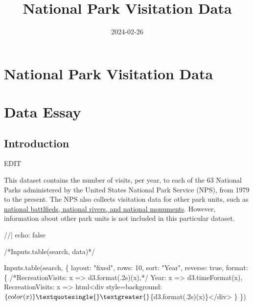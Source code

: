 \documentclass[
  letterpaper,
  DIV=11,
  numbers=noendperiod]{scrartcl}
\title{National Park Visitation Data}
\author{}
\date{2024-02-26}
\newenvironment{Shaded}{\begin{snugshade}}{\end{snugshade}}
\newcommand{\NormalTok}[1]{\textcolor[rgb]{0.00,0.23,0.31}{#1}}
\renewcommand*\contentsname{Table of contents}
\newcommand\contentsname{Table of contents}
\begin{document}
\maketitle

\renewcommand*\contentsname{Table of Contents}
{
\hypersetup{linkcolor=}
\setcounter{tocdepth}{5}
\tableofcontents
}
\section{National Park Visitation
Data}\label{national-park-visitation-data}

\section{Data Essay}

\subsection{Introduction}\label{introduction}

EDIT

This dataset contains the number of visits, per year, to each of the 63
National Parks administered by the United States National Park Service
(NPS), from 1979 to the present. The NPS also collects visitation data
for other park units, such as
\href{(https://www.nps.gov/aboutus/national-park-system.htm)}{national
battlfieds, national rivers, and national monuments}. However,
information about other park units is not included in this particular
dataset.

\begin{Shaded}
\begin{Highlighting}[]
\NormalTok{//| echo: false}

\NormalTok{/*Inputs.table(search, data)*/}

\NormalTok{Inputs.table(search, \{}
\NormalTok{  layout: "fixed",}
\NormalTok{  rows: 10,}
\NormalTok{  sort: "Year",}
\NormalTok{  reverse: true,}
\NormalTok{  format: \{}
\NormalTok{    /*RecreationVisits: x =\textgreater{} d3.format(\textquotesingle{}.2s\textquotesingle{})(x),*/}
\NormalTok{    Year: x =\textgreater{} d3.timeFormat(x),}
\NormalTok{    RecreationVisits: x =\textgreater{} html\textasciigrave{}\textless{}div style=\textquotesingle{}background:$\{color(x)\}\textquotesingle{}\textgreater{}$\{d3.format(\textquotesingle{}.2s\textquotesingle{})(x)\}\textless{}/div\textgreater{}\textasciigrave{}}
\NormalTok{  \}}
\NormalTok{\})}
\end{Highlighting}
\end{Shaded}
\end{document}
